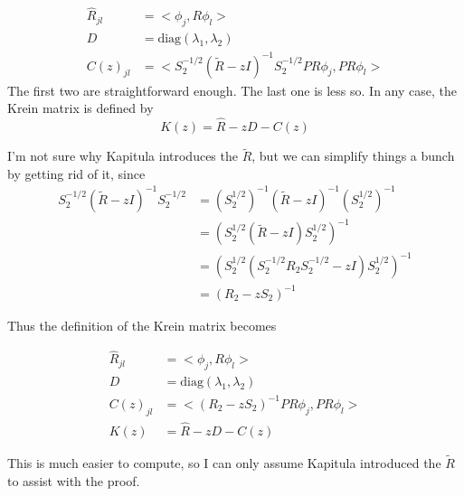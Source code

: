 \documentclass[12pt]{article}
\begin{document}
\begin{align}
\hat{R}_{jl} &= <\phi_j, R \phi_l> \\
D &= \textrm{diag}(\lambda_1, \lambda_2) \\
C(z)_{jl} &= <S_2^{-1/2}(\tilde{R} - zI)^{-1} S_2^{-1/2} P R \phi_j, P R \phi_l>
\end{align}
The first two are straightforward enough. The last one is less so. In any case, the Krein matrix is defined by 
\begin{equation}\label{kreinmatrix}
K(z) = \hat{R} - zD - C(z)
\end{equation}

I'm not sure why Kapitula introduces the $\tilde{R}$, but we can simplify things a bunch by getting rid of it, since
\begin{align}
S_2^{-1/2}(\tilde{R} - zI)^{-1} S_2^{-1/2} &= (S_2^{1/2})^{-1}(\tilde{R} - zI)^{-1} (S_2^{1/2})^{-1} \\
&= ( S_2^{1/2} ( \tilde{R} - zI ) S_2^{1/2} )^{-1} \\
&= ( S_2^{1/2} ( S_2^{-1/2} R_2 S_2^{-1/2} - zI ) S_2^{1/2} )^{-1} \\
&= ( R_2 - z S_2 )^{-1}
\end{align}

Thus the definition of the Krein matrix becomes

\begin{align}\label{kreinmatrixsimple}
\hat{R}_{jl} &= <\phi_j, R \phi_l> \\
D &= \textrm{diag}(\lambda_1, \lambda_2) \\
C(z)_{jl} &= < ( R_2 - zS_2 )^{-1} P R \phi_j, P R \phi_l> \\
K(z) &= \hat{R} - zD - C(z)
\end{align}

This is much easier to compute, so I can only assume Kapitula introduced the $\tilde{R}$ to assist with the proof.\\
\end{document}
